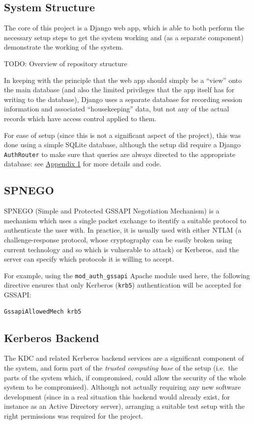 \documentclass{article}
\begin{document}
\subsection{System Structure}
The core of this project is a Django web app, which is able to both perform the necessary setup steps to get the system working and (as a separate component) demonstrate the working of the system.

TODO: Overview of repository structure

In keeping with the principle that the web app should simply be a ``view'' onto the main database (and also the limited privileges that the app itself has for writing to the database), Django uses a separate database for recording session information and associated ``housekeeping'' data, but not any of the actual records which have access control applied to them.

For ease of setup (since this is not a significant aspect of the project), this was done using a simple SQLite database, although the setup did require a Django \texttt{AuthRouter} to make sure that queries are always directed to the appropriate database: see \hyperref[sec:appendix1]{Appendix 1} for more details and code.

\subsection{SPNEGO}
SPNEGO (Simple and Protected GSSAPI Negotiation Mechanism) is a mechanism which uses a single packet exchange to itentify a suitable protocol to authenticate the user with. In practice, it is usually used with either NTLM (a challenge-response protocol, whose cryptography can be easily broken using current technology and so which is vulnerable to attack) or Kerberos, and the server can specify which protocols it is willing to accept.

For example, using the \verb+mod_auth_gssapi+ Apache module used here, the following directive ensures that only Kerberos (\texttt{krb5}) authentication will be accepted for GSSAPI:

\begin{verbatim}
GssapiAllowedMech krb5
\end{verbatim}

\subsection{Kerberos Backend}
The KDC and related Kerberos backend services are a significant component of the system, and form part of the \textit{trusted computing base} of the setup (i.e.\ the parts of the system which, if compromised, could allow the security of the whole system to be compromised). Although not actually requiring any new software development (since in a real situation this backend would already exist, for instance as an Active Directory server), arranging a suitable test setup with the right permissions was required for the project.
\end{document}
